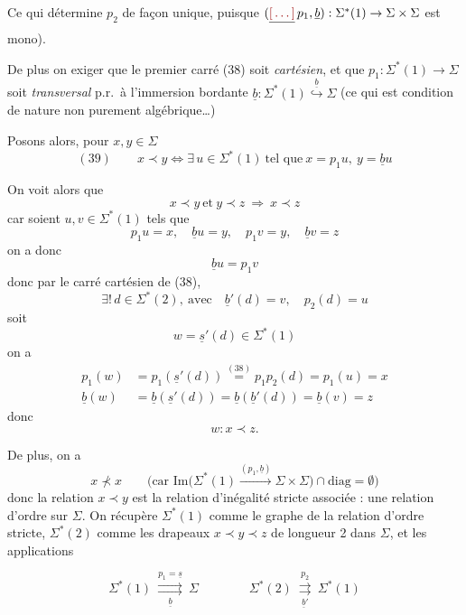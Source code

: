 \documentclass[11pt,a4paper]{article}
\begin{document}
Ce qui détermine $p_2$ de façon unique, puisque $(\struck{\ill{}}\,p_1,\underline b) : \Sigma^{*}(1)\to\Sigma\times\Sigma$ est mono).

De plus on   exiger que le premier carré (38) soit \emph{cartésien}, et que $p_1 : \Sigma^{*}(1)\to\Sigma$ soit \emph{transversal} p.r.\ à l'immersion bordante  $\underline b : \Sigma^{*}(1)\overset{\underline b}{\hookrightarrow}\Sigma$ (ce qui est \struck{\ill{}}  condition de nature non purement algébrique\ldots)

Posons alors, pour $x,y\in\Sigma$
\[
(39)\qquad x\prec y\iff\exists\,u\in\Sigma^{*}(1)\ \text{tel que}\ x=p_1u,\ y=\underline b u
\]


On voit alors que
\[
x\prec y\ \text{et}\ y\prec z\ \Longrightarrow\ x\prec z
\]
car soient $u,v\in\Sigma^{*}(1)$ tels que
\[
p_1u=x,\quad \underline b u=y,\quad p_1v=y,\quad \underline b v=z
\]
on a donc
\[
\underline b u=p_1v
\]
donc par le carré cartésien de (38), 
\[
\exists!\,d\in\Sigma^{*}(2),\ \text{avec}\quad \underline b'(d)=v,\quad p_2(d)=u
\]
soit
\[
w=\underline s'(d)\in\Sigma^{*}(1)
\]
on a
\[
\begin{aligned}
p_1(w)&=p_1(\underline s'(d))\overset{(38)}{=}p_1p_2(d)=p_1(u)=x\\
\underline b(w)&=\underline b(\underline s'(d))=\underline b(\underline b'(d))=\underline b(v)=z
\end{aligned}
\]
donc
\[
w : x\prec z .
\]

De plus, on a
\[
x\not\prec x\qquad\big(\text{car } \mathrm{Im}\big(\Sigma^{*}(1)\xrightarrow{(p_1,\underline b)}\Sigma\times\Sigma\big)\cap\mathrm{diag}=\emptyset\big)
\]
donc la relation $x\prec y$ est la relation d'inégalité stricte associée : une relation d'ordre sur $\Sigma$. On récupère $\Sigma^{*}(1)$ comme le graphe de la relation d'ordre stricte, $\Sigma^{*}(2)$ comme les drapeaux $x\prec y\prec z$ de longueur 2 dans $\Sigma$, et les applications


\[
\Sigma^{*}(1)\ \overset{p_1=\underline s}{\underset{\underline b}{\rightrightarrows}}\ \Sigma\qquad\qquad \Sigma^{*}(2)\ \overset{p_2}{\underset{\underline b'}{\rightrightarrows}}\ \Sigma^{*}(1)
\]
\end{document}
